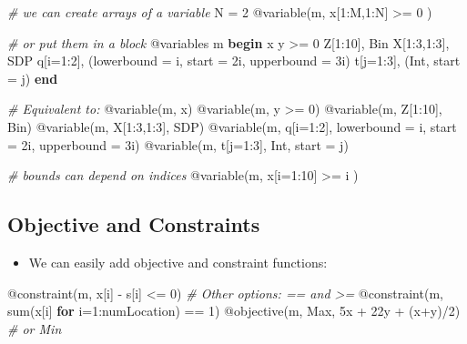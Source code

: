 \documentclass[11pt]{article}
\providecommand{\tightlist}{%
      \setlength{\itemsep}{0pt}\setlength{\parskip}{0pt}}
\newenvironment{Shaded}{}{}
\newcommand{\KeywordTok}[1]{\textcolor[rgb]{0.00,0.44,0.13}{\textbf{{#1}}}}
\newcommand{\DataTypeTok}[1]{\textcolor[rgb]{0.56,0.13,0.00}{{#1}}}
\newcommand{\FloatTok}[1]{\textcolor[rgb]{0.25,0.63,0.44}{{#1}}}
\newcommand{\CommentTok}[1]{\textcolor[rgb]{0.38,0.63,0.69}{\textit{{#1}}}}
\newcommand{\NormalTok}[1]{{#1}}
\begin{document}
    \begin{Shaded}
\begin{Highlighting}[]

\CommentTok{# we can create arrays of a variable}
\NormalTok{N = }\FloatTok{2}
\NormalTok{@variable(m, x[}\FloatTok{1}\NormalTok{:M,}\FloatTok{1}\NormalTok{:N] >= }\FloatTok{0} \NormalTok{)}

\CommentTok{# or put them in a block}
\NormalTok{@variables m }\KeywordTok{begin}
    \NormalTok{x}
    \NormalTok{y >= }\FloatTok{0}
    \NormalTok{Z[}\FloatTok{1}\NormalTok{:}\FloatTok{10}\NormalTok{], Bin}
    \NormalTok{X[}\FloatTok{1}\NormalTok{:}\FloatTok{3}\NormalTok{,}\FloatTok{1}\NormalTok{:}\FloatTok{3}\NormalTok{], SDP}
    \NormalTok{q[i=}\FloatTok{1}\NormalTok{:}\FloatTok{2}\NormalTok{], (lowerbound = i, start = }\FloatTok{2}\NormalTok{i, upperbound = }\FloatTok{3}\NormalTok{i)}
    \NormalTok{t[j=}\FloatTok{1}\NormalTok{:}\FloatTok{3}\NormalTok{], (}\DataTypeTok{Int}\NormalTok{, start = j)}
\KeywordTok{end}

\CommentTok{# Equivalent to:}
\NormalTok{@variable(m, x)}
\NormalTok{@variable(m, y >= }\FloatTok{0}\NormalTok{)}
\NormalTok{@variable(m, Z[}\FloatTok{1}\NormalTok{:}\FloatTok{10}\NormalTok{], Bin)}
\NormalTok{@variable(m, X[}\FloatTok{1}\NormalTok{:}\FloatTok{3}\NormalTok{,}\FloatTok{1}\NormalTok{:}\FloatTok{3}\NormalTok{], SDP)}
\NormalTok{@variable(m, q[i=}\FloatTok{1}\NormalTok{:}\FloatTok{2}\NormalTok{], lowerbound = i, start = }\FloatTok{2}\NormalTok{i, upperbound = }\FloatTok{3}\NormalTok{i)}
\NormalTok{@variable(m, t[j=}\FloatTok{1}\NormalTok{:}\FloatTok{3}\NormalTok{], }\DataTypeTok{Int}\NormalTok{, start = j)}

\CommentTok{# bounds can depend on indices}
\NormalTok{@variable(m, x[i=}\FloatTok{1}\NormalTok{:}\FloatTok{10}\NormalTok{] >= i )}
\end{Highlighting}
\end{Shaded}

    \subsection{Objective and Constraints}\label{objective-and-constraints}

\begin{itemize}
\tightlist
\item
  We can easily add objective and constraint functions:
\end{itemize}

\begin{Shaded}
\begin{Highlighting}[]
\NormalTok{@constraint(m, x[i] - s[i] <= }\FloatTok{0}\NormalTok{)  }\CommentTok{# Other options: == and >=}
\NormalTok{@constraint(m, sum(x[i] }\KeywordTok{for} \NormalTok{i=}\FloatTok{1}\NormalTok{:numLocation) == }\FloatTok{1}\NormalTok{)}
\NormalTok{@objective(m, Max, }\FloatTok{5}\NormalTok{x + }\FloatTok{22}\NormalTok{y + (x+y)/}\FloatTok{2}\NormalTok{) }\CommentTok{# or Min}
\end{Highlighting}
\end{Shaded}
\end{document}

